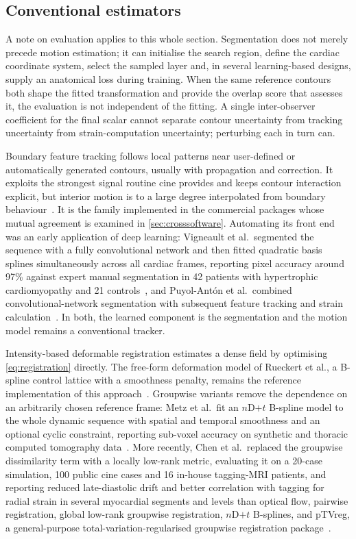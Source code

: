 \subsection{Conventional estimators}\label{sec:conventional}

A note on evaluation applies to this whole section. Segmentation does not merely precede motion
estimation; it can initialise the search region, define the cardiac coordinate system, select the
sampled layer and, in several learning-based designs, supply an anatomical loss during training.
When the same reference contours both shape the fitted transformation and provide the overlap score
that assesses it, the evaluation is not independent of the fitting. A single inter-observer
coefficient for the final scalar cannot separate contour uncertainty from tracking uncertainty from
strain-computation uncertainty; perturbing each in turn can.

Boundary feature tracking follows local patterns near user-defined or automatically generated
contours, usually with propagation and correction. It exploits the strongest signal routine cine
provides and keeps contour interaction explicit, but interior motion is to a large degree
interpolated from boundary behaviour~\citep{pedrizzetti2016}. It is the family implemented in the
commercial packages whose mutual agreement is examined in \cref{sec:crosssoftware}. Automating its
front end was an early application of deep learning: Vigneault et al.\ segmented the sequence with a
fully convolutional network and then fitted quadratic basis splines simultaneously across all cardiac
frames, reporting pixel accuracy around 97\% against expert manual segmentation in 42 patients with
hypertrophic cardiomyopathy and 21 controls~\citep{vigneault2017}, and Puyol-Ant\'on et al.\
combined convolutional-network segmentation with subsequent feature tracking and strain
calculation~\citep{puyolanton2018}. In both, the learned component is the segmentation and the
motion model remains a conventional tracker.

Intensity-based deformable registration estimates a dense field by optimising
\cref{eq:registration} directly. The free-form deformation model of Rueckert et al., a B-spline
control lattice with a smoothness penalty, remains the reference implementation of this
approach~\citep{rueckert1999}. Groupwise variants remove the dependence on an arbitrarily chosen
reference frame: Metz et al.\ fit an $n$D$+t$ B-spline model to the whole dynamic sequence with
spatial and temporal smoothness and an optional cyclic constraint, reporting sub-voxel accuracy on
synthetic and thoracic computed tomography data~\citep{metz2011}. More recently, Chen et al.\
replaced the groupwise dissimilarity term with a locally low-rank metric, evaluating it on a
20-case simulation, 100 public cine cases and 16 in-house tagging-MRI patients, and reporting
reduced late-diastolic drift and better correlation with tagging for radial strain in several
myocardial segments and levels than optical flow, pairwise registration, global low-rank groupwise
registration, $n$D$+t$ B-splines, and pTVreg, a general-purpose total-variation-regularised
groupwise registration package~\citep{chen2024}.

